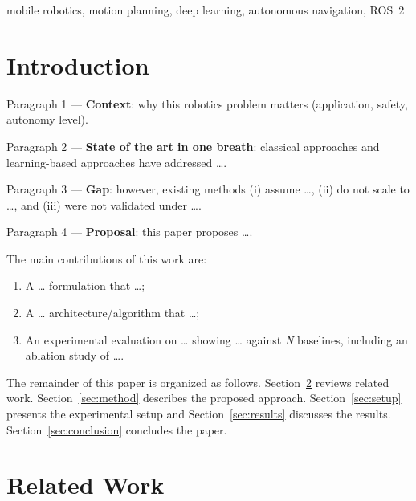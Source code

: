 \documentclass[conference]{IEEEtran}
\begin{document}
\begin{IEEEkeywords}
mobile robotics, motion planning, deep learning, autonomous navigation, ROS~2
\end{IEEEkeywords}

\section{Introduction}
\label{sec:intro}

Paragraph 1 --- \textbf{Context}: why this robotics problem matters
(application, safety, autonomy level).

Paragraph 2 --- \textbf{State of the art in one breath}: classical approaches
\cite{ref_classic} and learning-based approaches \cite{ref_learning} have
addressed \ldots.

Paragraph 3 --- \textbf{Gap}: however, existing methods
(i) assume \ldots, (ii) do not scale to \ldots, and (iii) were not validated
under \ldots.

Paragraph 4 --- \textbf{Proposal}: this paper proposes \ldots.

\noindent The main contributions of this work are:
\begin{enumerate}
  \item A \ldots{} formulation that \ldots;
  \item A \ldots{} architecture/algorithm that \ldots;
  \item An experimental evaluation on \ldots{} showing \ldots{} against
        \emph{N} baselines, including an ablation study of \ldots.
\end{enumerate}

The remainder of this paper is organized as follows.
Section~\ref{sec:related} reviews related work.
Section~\ref{sec:method} describes the proposed approach.
Section~\ref{sec:setup} presents the experimental setup and
Section~\ref{sec:results} discusses the results.
Section~\ref{sec:conclusion} concludes the paper.

\section{Related Work}
\label{sec:related}

\end{document}
